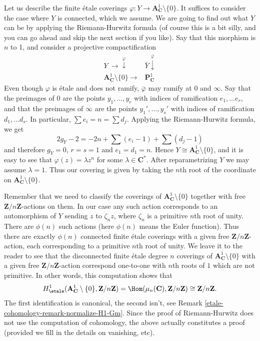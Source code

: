 \medskip\noindent
Let us describe the finite \'etale coverings
$\varphi : Y \to \mathbf{A}^1_\mathbf{C} \setminus \{0\}$.
It suffices to consider the case where $Y$ is
connected, which we assume. We are going to find out what $Y$ can be
by applying the Riemann-Hurwitz formula (of course this is a bit silly, and
you can go ahead and skip the next section if you like).
Say that this morphism is $n$ to 1, and consider a
projective compactification
$$
\begin{array}{cc}{Y\ } \longrightarrow\overset{\varphi}{\downarrow} & {\bar Y} \overset{\bar\varphi}{\downarrow} \\ {\mathbf{A}^1_\mathbf{C} \setminus \{0\}} \longrightarrow & {\mathbf{P}^1_\mathbf{C}}\end{array}
$$
Even though $\varphi$ is \'etale and does not ramify, $\bar{\varphi}$ may
ramify at 0 and $\infty$. Say that the preimages of 0 are the points $y_1,
\ldots, y_r$ with indices of ramification $e_1, \ldots e_r$, and that the
preimages of $\infty$ are the points $y_1', \ldots, y_s'$ with indices of
ramification $d_1, \ldots d_s$. In particular, $\sum e_i = n = \sum d_j$.
Applying the Riemann-Hurwitz formula, we get
$$
2 g_Y - 2 = -2n + \sum (e_i - 1) + \sum (d_j - 1)
$$
and therefore $g_Y = 0$, $r = s = 1$ and $e_1 = d_1 = n$.
Hence $Y \cong {\mathbf{A}^1_\mathbf{C} \setminus \{0\}}$, and it is easy to
see that $\varphi(z) = \lambda z^n$ for some $\lambda \in \mathbf{C}^*$.
After reparametrizing $Y$ we may assume $\lambda = 1$. Thus our
covering is given by taking the $n$th root of the coordinate on
$\mathbf{A}^1_{\mathbf{C}} \setminus \{0\}$.

\medskip\noindent
Remember that we need to classify the coverings of
${\mathbf{A}^1_\mathbf{C} \setminus \{0\}}$ together with free
$\mathbf{Z}/n\mathbf{Z}$-actions on them.
In our case any such action corresponds
to an automorphism of $Y$ sending $z$ to $\zeta_n z$, where $\zeta_n$ is a
primitive $n$th root of unity. There are $\phi(n)$ such actions
(here $\phi(n)$ means the Euler function). Thus there are exactly
$\phi(n)$ connected finite \'etale coverings with a given free
$\mathbf{Z}/n\mathbf{Z}$-action, each corresponding to a primitive
$n$th root of unity. We leave it to the reader to see that the
disconnected finite \'etale degree $n$ coverings of
$\mathbf{A}^1_{\mathbf{C}} \setminus \{0\}$ with a given free
$\mathbf{Z}/n\mathbf{Z}$-action correspond one-to-one with $n$th
roots of $1$ which are not primitive.
In other words, this computation shows that
$$
H_\etale^1 (\mathbf{A}^1_\mathbf{C} \setminus \{0\},
\mathbf{Z}/n\mathbf{Z}) =
\Hom(\mu_n(\mathbf{C}), \mathbf{Z}/n\mathbf{Z}) \cong \mathbf{Z}/n\mathbf{Z}.
$$
The first identification is canonical, the second isn't, see
Remark \ref{etale-cohomology-remark-normalize-H1-Gm}.
Since the proof of Riemann-Hurwitz does not use the computation of
cohomology, the above actually constitutes a proof (provided we
fill in the details on vanishing, etc).

